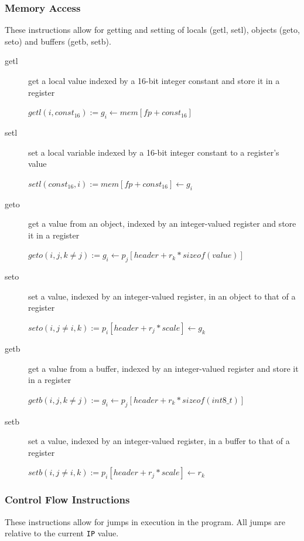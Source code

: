 \documentclass[english,a4paper]{article}
\begin{document}
\subsubsection{Memory Access}
These instructions allow for getting and setting of locals (getl,
setl), objects (geto, seto) and buffers (getb, setb).

\begin{description}
\item[getl] get a local value indexed by a 16-bit integer constant and
  store it in a register
  
  $getl(i, const_{16}):= g_{i} \longleftarrow mem[fp + const_{16}]$ \\
\item[setl] set a local variable indexed by a 16-bit integer constant
  to a register's value
  
  $setl(const_{16}, i):= mem[fp + const_{16}] \longleftarrow g_{i}$ \\
\item[geto] get a value from an object, indexed by an integer-valued
  register and store it in a register
  
  $geto(i, j, k\neq j):= g_{i} \longleftarrow p_{j}[header + r_{k}*sizeof(value)]$ \\
\item[seto] set a value, indexed by an integer-valued register, in an
  object to that of a register
  
  $seto(i, j \neq i, k):= p_{i}[header + r_{j}*scale] \longleftarrow g_{k}$ \\
\item[getb] get a value from a buffer, indexed by an integer-valued
  register and store it in a register
  
  $getb(i, j, k\neq j):= g_{i} \longleftarrow p_{j}[header + r_{k}*sizeof(int8\_t)]$ \\
\item[setb] set a value, indexed by an integer-valued register, in a
  buffer to that of a register
  
  $setb(i, j \neq i, k):= p_{i}[header + r_{j}*scale] \longleftarrow r_{k}$ \\
\end{description}

\subsubsection{Control Flow Instructions}

These instructions allow for jumps in execution in the program. All
jumps are relative to the current \verb|IP| value.
\end{document}
